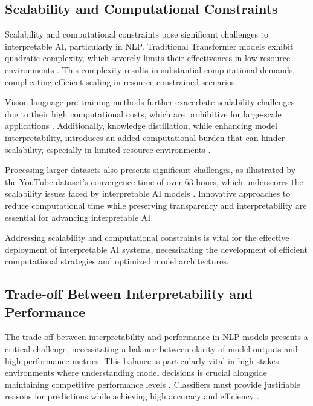 \subsection{Scalability and Computational Constraints} \label{subsec:Scalability and Computational Constraints}

Scalability and computational constraints pose significant challenges to interpretable AI, particularly in NLP. Traditional Transformer models exhibit quadratic complexity, which severely limits their effectiveness in low-resource environments \cite{zhu2024deformableaudiotransformeraudio}. This complexity results in substantial computational demands, complicating efficient scaling in resource-constrained scenarios.

Vision-language pre-training methods further exacerbate scalability challenges due to their high computational costs, which are prohibitive for large-scale applications \cite{li2023blip}. Additionally, knowledge distillation, while enhancing model interpretability, introduces an added computational burden that can hinder scalability, especially in limited-resource environments \cite{zhao2022lifelonglearningmultilingualneural}.

Processing larger datasets also presents significant challenges, as illustrated by the YouTube dataset's convergence time of over 63 hours, which underscores the scalability issues faced by interpretable AI models \cite{shakarian2022reasoningcomplexnetworkslogic}. Innovative approaches to reduce computational time while preserving transparency and interpretability are essential for advancing interpretable AI.

Addressing scalability and computational constraints is vital for the effective deployment of interpretable AI systems, necessitating the development of efficient computational strategies and optimized model architectures.

\subsection{Trade-off Between Interpretability and Performance} \label{subsec:Trade-off Between Interpretability and Performance}

The trade-off between interpretability and performance in NLP models presents a critical challenge, necessitating a balance between clarity of model outputs and high-performance metrics. This balance is particularly vital in high-stakes environments where understanding model decisions is crucial alongside maintaining competitive performance levels \cite{sen2018supervisingfeatureinfluence}. Classifiers must provide justifiable reasons for predictions while achieving high accuracy and efficiency \cite{sen2018supervisingfeatureinfluence}.


